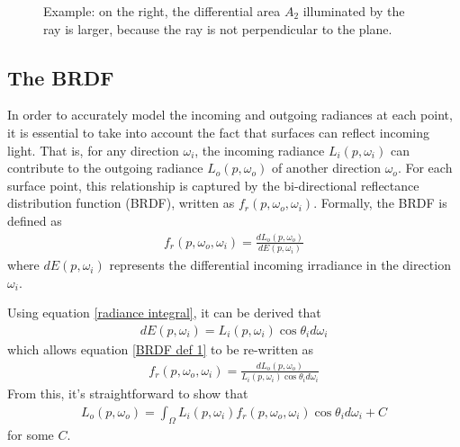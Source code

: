 \begin{figure}[H]
    

\caption{Example: on the right, the differential area $A_2$ illuminated by the ray is larger, because the ray is not perpendicular to the plane.}    
\end{figure}


\subsection{The BRDF}

In order to accurately model the incoming and outgoing radiances at each point, it is essential to take into account the fact that surfaces can reflect incoming light. That is, for any direction $\omega_i$, the incoming radiance $L_i(p,\omega_i)$ can contribute to the outgoing radiance $L_o(p,\omega_o)$ of another direction $\omega_o$. For each surface point, this relationship is captured by the bi-directional reflectance distribution function (BRDF), written as $f_r(p,\omega_o,\omega_i)$. Formally, the BRDF is defined as 
\begin{align}
    f_r(p,\omega_o,\omega_i) = \frac{dL_o(p,\omega_o)}{dE(p,\omega_i)}
    \label{BRDF def 1}
\end{align}
where $dE(p,\omega_i)$ represents the differential incoming irradiance in the direction $\omega_i$.

Using equation \ref{radiance integral}, it can be derived that 
\begin{align}
    dE(p,\omega_i) = L_i(p,\omega_i)\cos\theta_id\omega_i
\end{align}
which allows equation \ref{BRDF def 1} to be re-written as
\begin{align}
    f_r(p,\omega_o,\omega_i) = \frac{dL_o(p,\omega_o)}{L_i(p,\omega_i)\cos\theta_id\omega_i}
\end{align}
From this, it's straightforward to show that
\begin{align}
    L_o(p,\omega_o) = \int_\Omega L_i(p,\omega_i)f_r(p,\omega_o,\omega_i)\cos\theta_id\omega_i + C
    \label{reflection plus C}
\end{align}
for some $C$.

